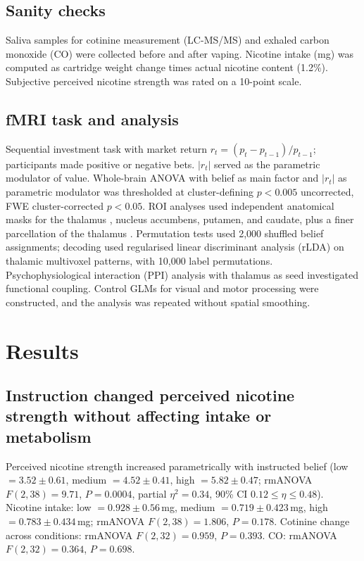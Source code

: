 \documentclass[11pt]{article}
\begin{document}
\subsection{Sanity checks}
Saliva samples for cotinine measurement (LC-MS/MS) and exhaled carbon monoxide (CO) were collected before and after vaping. Nicotine intake (mg) was computed as cartridge weight change times actual nicotine content (1.2\%). Subjective perceived nicotine strength was rated on a 10-point scale.

\subsection{fMRI task and analysis}
Sequential investment task with market return $r_t=(p_t - p_{t-1})/p_{t-1}$; participants made positive or negative bets. $|r_t|$ served as the parametric modulator of value. Whole-brain ANOVA with belief as main factor and $|r_t|$ as parametric modulator was thresholded at cluster-defining $p<0.005$ uncorrected, FWE cluster-corrected $p<0.05$. ROI analyses used independent anatomical masks for the thalamus \citep{r28}, nucleus accumbens, putamen, and caudate, plus a finer parcellation of the thalamus \citep{r29}. Permutation tests used 2,000 shuffled belief assignments; decoding used regularised linear discriminant analysis (rLDA) on thalamic multivoxel patterns, with 10,000 label permutations. Psychophysiological interaction (PPI) analysis with thalamus as seed investigated functional coupling. Control GLMs for visual and motor processing were constructed, and the analysis was repeated without spatial smoothing.

\section{Results}
\subsection{Instruction changed perceived nicotine strength without affecting intake or metabolism}
Perceived nicotine strength increased parametrically with instructed belief (low $=3.52 \pm 0.61$, medium $=4.52 \pm 0.41$, high $=5.82 \pm 0.47$; rmANOVA $F(2,38)=9.71$, $P=0.0004$, partial $\eta^2=0.34$, 90\% CI $0.12 \leq \eta \leq 0.48$). Nicotine intake: low $=0.928 \pm 0.56$\,mg, medium $=0.719 \pm 0.423$\,mg, high $=0.783 \pm 0.434$\,mg; rmANOVA $F(2,38)=1.806$, $P=0.178$. Cotinine change across conditions: rmANOVA $F(2,32)=0.959$, $P=0.393$. CO: rmANOVA $F(2,32)=0.364$, $P=0.698$.
\end{document}
